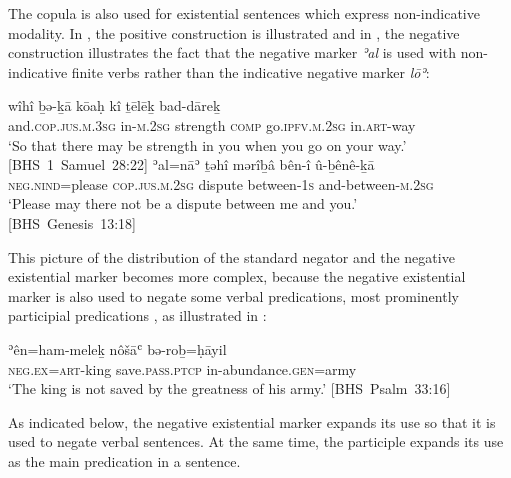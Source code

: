 \documentclass[output=paper,colorlinks,citecolor=brown,draft,draftmode]{langscibook}
\begin{document}
%
The copula is also used for existential sentences which express
non-indicative modality. In , the positive
construction is illustrated and in , the negative construction illustrates the fact that the negative marker \textit{ʾal}  is used with non-indicative finite verbs rather than the indicative negative marker \textit{lōʾ}:
%
\begin{exe}\ex\begin{xlist}
\ex\label{ex:heb-strength}
\gll wîhî ḇə-ḵā kōaḥ kî ṯēlēḵ bad-dāreḵ\\
and.\textsc{cop.jus.m.3sg} in-\textsc{m.2sg} strength \textsc{comp}
go.\textsc{ipfv.m.2sg} in.\textsc{art}{}-way\\
\glt `So that there may be strength in you when you go on your
way.' \\\mbox{[BHS 1 Samuel 28:22]}
%
\ex\label{ex:heb-dispute}
\gll ʾal=nāʾ ṯəhî mərîḇâ bên-î û-ḇênê-ḵā \\
\textsc{neg.nind}=please  \textsc{cop.jus.m.2sg} dispute between-\textsc{1s}
and-between-\textsc{m.2sg}\\
\glt `Please may there not be a dispute between me and you.'\\
\mbox{[BHS Genesis 13:18]}
\end{xlist}\end{exe}
%
This picture of the distribution of the standard negator and the negative
existential marker becomes more complex, because the negative existential
marker is also used to negate some verbal predications, most prominently
participial predications \parencite[see][]{MillerNaude2015}, as illustrated
in :
%
\begin{exe}\ex\label{ex:heb-king-not-saved}
    \gll ʾên=ham-meleḵ nôšāʿ bə-roḇ=ḥāyil\\
  \textsc{neg.ex}=\textsc{art}-king save.\textsc{pass.ptcp}\footnotemark{} %
 in-abundance.\textsc{gen}=army \\
    \glt  `The king is not saved by the greatness of his army.'
    \mbox{[BHS Psalm 33:16]}
    \end{exe}
As indicated below, the negative existential marker expands its use so
that it is used to negate verbal sentences. At the same time, the
participle expands its use as the main predication in a sentence.
\end{document}
